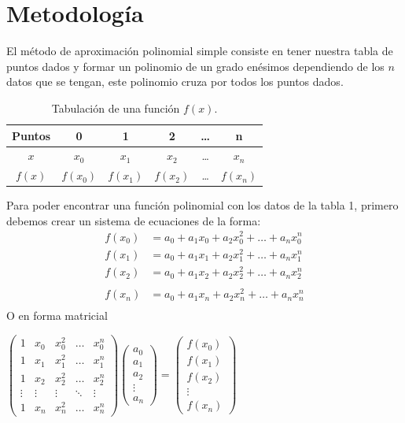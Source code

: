 \documentclass[12pt]{article}
\begin{document}
		\section*{\centering Metodología}\label{sec:Metodologia}
			El método de aproximación polinomial simple consiste en tener nuestra tabla de puntos dados y 
			formar un polinomio de un grado enésimos dependiendo de los $ n $ datos que se tengan, este 
			polinomio cruza por todos los puntos dados.
			\begin{table}[h!]
				\centering
				\begin{tabular}{|c    c    c    c    c    c|}
					\hline
					\textbf{Puntos} & 0 & 1 & 2 & \dots & n \\\hline
					$x$ & $x_0$ & $x_1$ & $x_2$ & \dots &  $x_n$ \\\hline
					$f(x)$ & $f(x_0)$ & $f(x_1)$ & $f(x_2)$ & \dots & $f(x_n)$ \\\hline								
				\end{tabular}
				\caption{Tabulación de una función $f(x)$. \cite{bib:item3}}
				\label{tab:1}
			\end{table}
			Para poder encontrar una función polinomial con los datos de la tabla 1, primero debemos 
			crear un sistema de ecuaciones de la forma:
			\begin{align*}
				f(x_0) &= a_0 + a_1x_0 + a_2x_0^2 + \dots + a_nx_0^{n} \\
				f(x_1) &= a_0 + a_1x_1 + a_2x_1^2 + \dots + a_nx_1^{n} \\
				f(x_2) &= a_0 + a_1x_2 + a_2x_2^2 + \dots + a_nx_2^{n} \\\\
				f(x_n) &= a_0 + a_1x_n + a_2x_n^2 + \dots + a_nx_n^{n} \\
			\end{align*}
			O en forma matricial\\
			\begin{center}
				$
				\left(\begin{array}{ccccc}
					1 & x_0 & x_0^2 & \dots & x_0^{n} \\
					1 & x_1 & x_1^2 & \dots & x_1^{n} \\
					1 & x_2 & x_2^2 & \dots & x_2^{n} \\
					\vdots & \vdots & \vdots & \ddots & \vdots \\
					1 & x_n & x_n^2 & \dots & x_n^{n}
			    \end{array}\right)
			    \left(\begin{array}{c}
					a_0 \\
					a_1 \\
					a_2 \\
					\vdots \\
					a_n 
			   	\end{array}\right)
			   	=
			   	\left(\begin{array}{c}
				f(x_0) \\
				f(x_1) \\
				f(x_2) \\
				\vdots \\
				f(x_n) 
		   		\end{array}\right)
			   	$
			\end{center}
\end{document}
